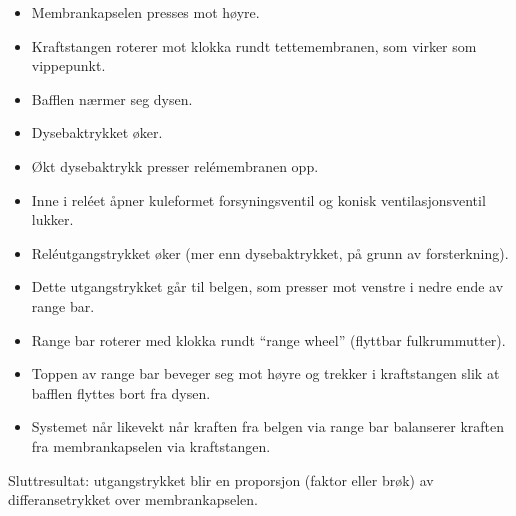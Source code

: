 \begin{itemize}
\item{} Membrankapselen presses mot høyre.
\item{} Kraftstangen roterer mot klokka rundt tettemembranen, som virker som vippepunkt.
\item{} Bafflen nærmer seg dysen.
\item{} Dysebaktrykket øker.
\item{} Økt dysebaktrykk presser relémembranen opp.
\item{} Inne i reléet åpner kuleformet forsyningsventil og konisk ventilasjonsventil lukker.
\item{} Reléutgangstrykket øker (mer enn dysebaktrykket, på grunn av forsterkning).
\item{} Dette utgangstrykket går til belgen, som presser mot venstre i nedre ende av range bar.
\item{} Range bar roterer med klokka rundt ``range wheel'' (flyttbar fulkrummutter).
\item{} Toppen av range bar beveger seg mot høyre og trekker i kraftstangen slik at bafflen flyttes bort fra dysen.
\item{} Systemet når likevekt når kraften fra belgen via range bar balanserer kraften fra membrankapselen via kraftstangen.
\end{itemize}

Sluttresultat: utgangstrykket blir en proporsjon (faktor eller brøk) av differansetrykket over membrankapselen.











